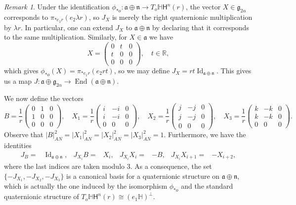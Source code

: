 \documentclass[12pt, a4paper]{amsart}
\newcommand{\g}{\mathfrak}
\newcommand{\R}{\mathbb{R}}
\renewcommand{\H}{\mathbb{H}}
\theoremstyle{remark}
\newtheorem{remark}{Remark}
\begin{document}
\begin{remark}
	Under the identification $\phi_{*o}\colon \g{a}\oplus\g{n}\to T_{o}\H \mathsf{H}^{n}(r)$, the vector $X\in \g{g}_{2\alpha}$ corresponds to $\pi_{*e_{1}r}(e_{2}\lambda r)$, so $J_{X}$ is merely the right quaternionic multiplication by $\lambda r$.
	In particular, one can extend $J_{X}$ to $\g{a}\oplus \g{n}$ by declaring that it corresponds to the same multiplication.
	Similarly, for $X\in \g{a}$ we have
	\[
		X=\left(
			\begin{array}{cc|c}
				0 & t & 0 \\
				t & 0 & 0 \\
				\hline
				0 & 0 & 0
			\end{array}
		\right),\quad t\in \R,
	\]
	which gives $\phi_{*o}(X)=\pi_{*e_{1}r}(e_{2}rt)$, so we may define $J_{X}= rt\operatorname{Id}_{\g{a}\oplus\g{n}}$.
	This gives us a map $J\colon \g{a}\oplus \g{g}_{2\alpha}\to\operatorname{End}(\g{a}\oplus\g{n})$.
\end{remark}
We now define the vectors
\[
	B=\frac{1}{r}\left(
		\begin{array}{cc|c}
			0 & 1 & 0 \\
			1 & 0 & 0 \\
			\hline
			0 & 0 & 0
		\end{array}
	\right),\quad
	X_{1}=\frac{1}{r}\left(
	\begin{array}{cc|c}
		i & -i & 0 \\
		i & -i & 0 \\
		\hline
		0 & 0 & 0
	\end{array}
	\right),\quad
	X_{2}=\frac{1}{r}\left(
	\begin{array}{cc|c}
		j & -j & 0 \\
		j & -j & 0 \\
		\hline
		0 & 0 & 0
	\end{array}
	\right),\quad
	X_{3}=\frac{1}{r}\left(
	\begin{array}{cc|c}
		k & -k & 0 \\
		k & -k & 0 \\
		\hline
		0 & 0 & 0
	\end{array}
	\right).
\]
Observe that $\lvert B \rvert_{AN}^{2}=\lvert X_{1} \rvert_{AN}^{2}=\lvert X_{2} \rvert_{AN}^{2}=\lvert X_{3} \rvert_{AN}^{2}=1$.
Furthermore, we have the identities
\begin{align*}
	J_{B}={}&\operatorname{Id}_{\g{a}\oplus\g{n}}, & J_{X_{i}}B={}&X_{i}, & J_{X_{i}}X_{i}={}&-B, & J_{X_{i}}X_{i+1}={}&-X_{i+2},
\end{align*}
where the last indices are taken modulo $3$.
As a consequence, the set $\{-J_{X_{1}},-J_{X_{2}},-J_{X_{3}}\}$ is a canonical basis for a quaternionic structure on $\g{a}\oplus\g{n}$, which is actually the one induced by the isomorphism $\phi_{*o}$ and the standard quaternionic structure of $T_{o}\H\mathsf{H}^{n}(r)\cong (e_{1}\H)^{\perp}$.
\end{document}
